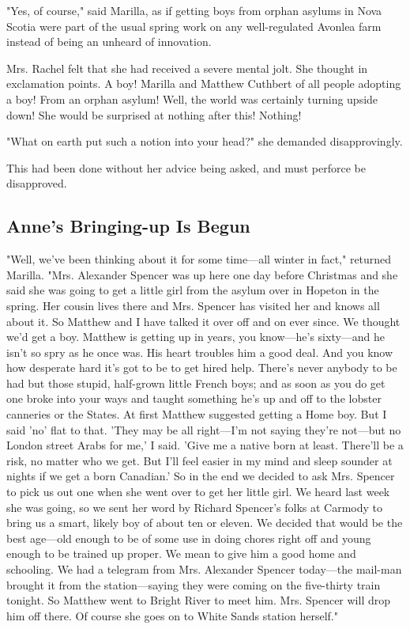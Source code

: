 \documentclass{article}
\begin{document}
"Yes, of course," said Marilla, as if getting boys from orphan asylums in Nova Scotia were part of the usual spring work on any well-regulated Avonlea farm instead of being an unheard of innovation.

Mrs. Rachel felt that she had received a severe mental jolt. She thought in exclamation points. A boy! Marilla and Matthew Cuthbert of all people adopting a boy! From an orphan asylum! Well, the world was certainly turning upside down! She would be surprised at nothing after this! Nothing!

"What on earth put such a notion into your head?" she demanded disapprovingly.

This had been done without her advice being asked, and must perforce be disapproved.

\subsection{Anne's Bringing-up Is Begun}
"Well, we've been thinking about it for some time---all winter in fact," returned Marilla. "Mrs. Alexander Spencer was up here one day before Christmas and she said she was going to get a little girl from the asylum over in Hopeton in the spring. Her cousin lives there and Mrs. Spencer has visited her and knows all about it. So Matthew and I have talked it over off and on ever since. We thought we'd get a boy. Matthew is getting up in years, you know---he's sixty---and he isn't so spry as he once was. His heart troubles him a good deal. And you know how desperate hard it's got to be to get hired help. There's never anybody to be had but those stupid, half-grown little French boys; and as soon as you do get one broke into your ways and taught something he's up and off to the lobster canneries or the States. At first Matthew suggested getting a Home boy. But I said 'no' flat to that. 'They may be all right---I'm not saying they're not---but no London street Arabs for me,' I said. 'Give me a native born at least. There'll be a risk, no matter who we get. But I'll feel easier in my mind and sleep sounder at nights if we get a born Canadian.' So in the end we decided to ask Mrs. Spencer to pick us out one when she went over to get her little girl. We heard last week she was going, so we sent her word by Richard Spencer's folks at Carmody to bring us a smart, likely boy of about ten or eleven. We decided that would be the best age---old enough to be of some use in doing chores right off and young enough to be trained up proper. We mean to give him a good home and schooling. We had a telegram from Mrs. Alexander Spencer today---the mail-man brought it from the station---saying they were coming on the five-thirty train tonight. So Matthew went to Bright River to meet him. Mrs. Spencer will drop him off there. Of course she goes on to White Sands station herself."
\end{document}
